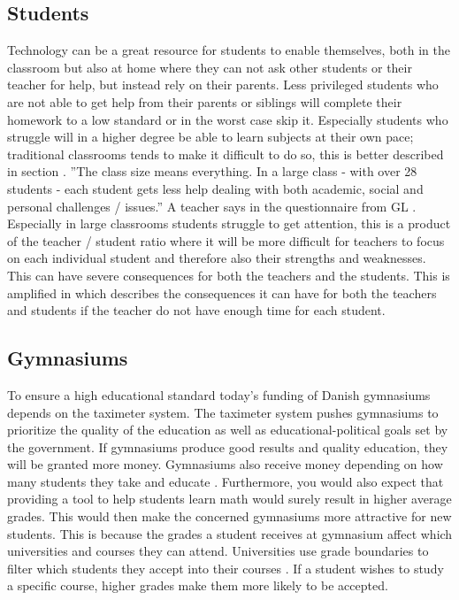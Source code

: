 \subsection*{Students}
Technology can be a great resource for students to enable themselves, both in the classroom but also at home where they can not ask other students or their teacher for help, but instead rely on their parents. Less privileged students who are not able to get help from their parents or siblings will complete their homework to a low standard or in the worst case skip it. Especially students who struggle will in a higher degree be able to learn subjects at their own pace; traditional classrooms tends to make it difficult to do so, this is better described in section .
\newline\newline
”The class size means everything. In a large class - with over 28 students - each student gets less help dealing with both academic, social and personal challenges / issues.” A teacher says in the questionnaire from GL \cite{Rasmussen2018NyGymnasieskolen}.
\newline\newline
Especially in large classrooms students struggle to get attention, this is a product of the teacher / student ratio where it will be more difficult for teachers to focus on each individual student and therefore also their strengths and weaknesses. This can have severe consequences for both the teachers and the students. This is amplified in  which describes the consequences it can have for both the teachers and students if the teacher do not have enough time for each student.  

\subsection*{Gymnasiums}
To ensure a high educational standard today's funding of Danish gymnasiums depends on the taximeter system. The taximeter system pushes gymnasiums to prioritize the quality of the education as well as educational-political goals set by the government. If gymnasiums produce good results and quality education, they will be granted more money. Gymnasiums also receive money depending on how many students they take and educate \cite{RegeringenUndervisningsministeriet}.
\newline\newline
Furthermore, you would also expect that providing a tool to help students learn math would surely result in higher average grades. This would then make the concerned gymnasiums more attractive for new students. This is because the grades a student receives at gymnasium affect which universities and courses they can attend. Universities use grade boundaries to filter which students they accept into their courses \cite{Tjek2}. If a student wishes to study a specific course, higher grades make them more likely to be accepted.



